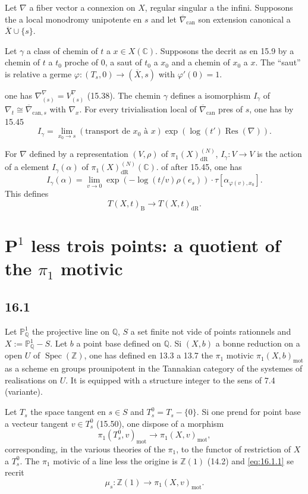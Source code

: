 \documentclass[12pt,a4paper]{article}
\theoremstyle{plain}
\theoremstyle{definition}
\theoremstyle{remark}
\DeclareMathOperator{\Spec}{Spec}
\DeclareMathOperator{\Res}{Res}
\newcommand{\bZ}{\mathbb{Z}}
\newcommand{\bQ}{\mathbb{Q}}
\newcommand{\bC}{\mathbb{C}}
\newcommand{\bP}{\mathbb{P}}
\newcommand{\dr}{\mathrm{dR}}
\newcommand{\B}{\mathrm{B}}
\newcommand{\mot}{\mathrm{mot}}
\begin{document}
Let $\nabla$ a fiber vector a connexion on $X$, regular singular a the infini. Supposons the a local monodromy unipotente en $s$ and let $\overline{\nabla}_{\text{can}}$ son extension canonical a $\overline{X} \cup \{s\}$.

Let $\gamma$ a class of chemin of $t$ a $x \in X(\bC)$. Supposons the decrit as en 15.9 by a chemin of $t$ a $t_0$ proche of $0$, a saut of $t_0$ a $x_0$ and a chemin of $x_0$ a $x$. The ``saut'' is relative a germe $\varphi: (T_s, 0) \to (\overline{X}, s)$ with $\varphi'(0) = 1$.

one has $\nabla_{(s)}^\nabla = V^\nabla_{(s)}$ (15.38). The chemin $\gamma$ defines a isomorphism $I_\gamma$ of $\nabla_t \cong \overline{\nabla}_{\text{can}, s}$ with $\nabla_x$. For every trivialisation local of $\overline{\nabla}_{\text{can}}$ pres of $s$, one has by 15.45
\[
I_\gamma = \lim_{x_0 \to s} (\text{transport de } x_0 \text{ à } x) \exp(\log(t') \Res(\nabla)).
\]

For $\nabla$ defined by a representation $(V, \rho)$ of $\pi_1(X)_{\dr}^{(N)}$, $I_\gamma: V \to V$ is the action of a element $I_\gamma(\alpha)$ of $\pi_1(X)_{\dr}^{(N)}(\bC)$. of after 15.45, one has
\[
I_\gamma(\alpha) = \lim_{v \to 0} \exp(-\log(t/v) \rho(e_s)) \cdot \tau[\alpha_{\varphi(v), x_0}].
\]
This defines
\[
T(X, t)_{\B} \to T(X, t)_{\dr}.
\]


\section{$\mathbf{P}^1$ less trois points: a quotient of the $\pi_1$ motivic}\label{sec:16}

\subsection*{16.1}

Let $\bP^1_{\bQ}$ the projective line on $\bQ$, $S$ a set finite not vide of points rationnels and $X := \bP^1_{\bQ} - S$. Let $b$ a point base defined on $\bQ$. Si $(X, b)$ a bonne reduction on a open $U$ of $\Spec(\bZ)$, one has defined en 13.3 a 13.7 the $\pi_1$ motivic $\pi_1(X, b)_{\mot}$ as a scheme en groups prounipotent in the Tannakian category of the systemes of realisations on $U$. It is equipped with a structure integer to the sens of 7.4 (variante).

Let $T_s$ the space tangent en $s \in S$ and $T_s^0 = T_s - \{0\}$. Si one prend for point base a vecteur tangent $v \in T_s^0$ (15.50), one dispose of a morphism
\begin{equation}\label{eq:16.1.1}
\pi_1(T_s^0, v)_{\mot} \to \pi_1(X, v)_{\mot},
\end{equation}
corresponding, in the various theories of the $\pi_1$, to the functor of restriction of $X$ a $T_s^0$. The $\pi_1$ motivic of a line less the origine is $\bZ(1)$ (14.2) and \eqref{eq:16.1.1} se recrit
\begin{equation}\label{eq:16.1.2}
\mu_s: \bZ(1) \to \pi_1(X, v)_{\mot}.
\end{equation}
\end{document}
